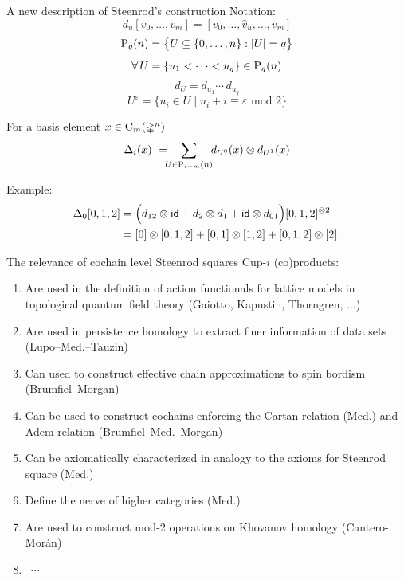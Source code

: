 \documentclass[10pt,t]{beamer} %
\begin{document}
\begin{frame}[fragile]{A new description of Steenrod's construction}
	\pause \vskip -5pt \textcolor{pblue}{Notation:} \vspace*{-5pt}
	\[
	d_u[v_0, \dots, v_m] = [v_0, \dots, \widehat v_u, \dots, v_m]
	\]
	\pause \vspace*{-15pt}
	\[
	\mathrm{P}_q(n) = \big\{ U \subseteq \{0,\dots,n\} : \lvert U\rvert = q \big\}
	\]
	\pause \vspace*{-15pt}
	\[
	\forall \, U = \{u_1 < \dots < u_q\} \in \mathrm{P}_q(n)
	\]
	\pause \vspace*{-15pt}
	\[
	d_U = d_{u_1} \dotsm \, d_{u_q}
	\]
	\pause \vspace*{-15pt}
	\[
	U^\varepsilon = \big\{ u_i \in U \mid u_i + i \equiv \varepsilon \text{ mod } 2 \big\}
	\]
	\pause \vskip -10pt
	\begin{definition}[Med.]
		For a basis element $x \in \operatorname{C}_m(\mathbb{\Delta}^n)$
		\vspace*{-5pt}
		\[
		\Delta_i(x) \ = \!\!\! \sum_{U \in \mathrm{P}_{i-m}(n)} \!\! d_{U^0}(x) \otimes d_{U^1}(x)
		\]
		\vspace*{-10pt}
	\end{definition}
	\pause \textcolor{pblue}{Example:} \vspace*{-5pt}
	\begin{align*}
	\Delta_0 [0,1,2] &=
	\Big( d_{12} \otimes \mathsf{id} + d_2 \otimes d_1 + \mathsf{id} \otimes d_{01} \Big) [0,1,2]^{\otimes 2} \\ &=
	[0] \otimes [0,1,2] + [0,1] \otimes [1,2] + [0,1,2] \otimes [2].
	\end{align*}
\end{frame}

\begin{frame}{The relevance of cochain level Steenrod squares}
	\pause \vskip -5pt \textcolor{pblue}{Cup-$i$ (co)products:} \smallskip
	\begin{enumerate}
		\item Are used in the definition of action functionals for lattice models in topological quantum field theory (Gaiotto, Kapustin, Thorngren, ...) \pause
		\item Are used in persistence homology to extract finer information of data sets (Lupo--Med.--Tauzin) \pause
		\item Can used to construct effective chain approximations to spin bordism (Brumfiel--Morgan) \pause
		\item Can be used to construct cochains enforcing the Cartan relation (Med.) and Adem relation (Brumfiel--Med.--Morgan) \pause
		\item Can be axiomatically characterized in analogy to the axioms for Steenrod square (Med.) \pause
		\item Define the nerve of higher categories (Med.) \pause
		\item Are used to construct mod-2 operations on Khovanov homology (Cantero-Mor\'{a}n) \pause
		\item \ $\cdots$
	\end{enumerate}
\end{frame}
\end{document}
